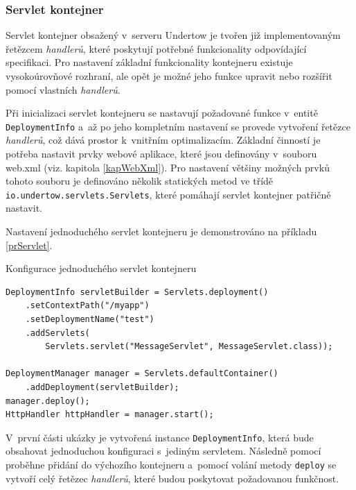             \subsubsection{Servlet kontejner}
                Servlet kontejner obsažený v~serveru Undertow je tvořen již implementovaným
                řetězcem \emph{handlerů}, které poskytují potřebné funkcionality odpovídající specifikaci.
                Pro nastavení základní funkcionality kontejneru existuje vysokoúrovňové rozhraní,
                ale opět je možné jeho funkce upravit nebo rozšířit pomocí vlastních \emph{handlerů}. 

                Při inicializaci servlet kontejneru se nastavují požadované funkce v~entitě \texttt{DeploymentInfo}
                a~až po jeho kompletním nastavení se provede vytvoření řetězce \emph{handlerů}, což
                dává prostor k~vnitřním optimalizacím. 
                Základní činností je potřeba nastavit prvky webové aplikace, které jsou definovány v~souboru web.xml (viz. kapitola \ref{kapWebXml}).
                Pro nastavení většiny možných prvků tohoto souboru je
                definováno několik statických metod ve třídě \\\texttt{io.undertow.servlets.Servlets}, které    %
                pomáhají servlet kontejner patřičně nastavit.

                Nastavení jednoduchého servlet kontejneru je demonstrováno na příkladu \ref{prServlet}.

\begin{priklad} \label{prServlet} Konfigurace jednoduchého servlet kontejneru
\begin{verbatim}
DeploymentInfo servletBuilder = Servlets.deployment()
    .setContextPath("/myapp")
    .setDeploymentName("test")
    .addServlets(
        Servlets.servlet("MessageServlet", MessageServlet.class));

DeploymentManager manager = Servlets.defaultContainer()
    .addDeployment(servletBuilder);
manager.deploy();
HttpHandler httpHandler = manager.start();
\end{verbatim}
\end{priklad}
                V~první části ukázky je vytvořená instance \texttt{DeploymentInfo}, která bude obsahovat jednoduchou konfiguraci
                s~jediným servletem. Následně pomocí proběhne přidání do výchozího kontejneru a~pomocí volání metody \texttt{deploy}
                se vytvoří celý řetězec \emph{handlerů}, které budou poskytovat požadovanou funkčnost.
                
